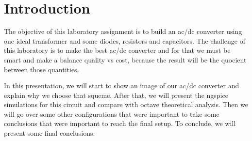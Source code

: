 \newpage
\section{Introduction}
\label{sec:introduction}

The objective of this laboratory assignment is to build an ac/dc converter using one ideal transformer and some diodes, resistors and capacitors.
The challenge of this laboratory is to make the best ac/dc converter and for that we must be smart and make a balance quality vs cost, because the result will be the
quocient between those quantities.

In this presentation, we will start to show an image of our ac/dc converter and explain why we choose that squeme. After that, we will present the ngspice simulations 
for this circuit and compare with octave theoretical analysis. Then we will go over some other configurations that were important to take some conclusions that were 
important to reach the final setup. To conclude, we will present some final conclusions.


